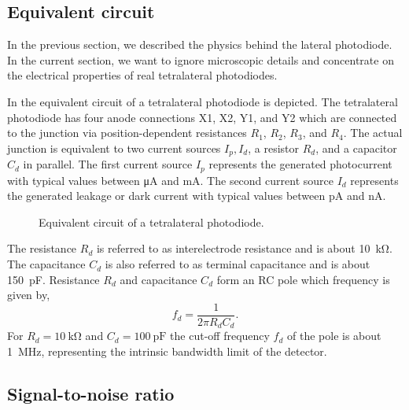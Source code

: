 \subsection{Equivalent circuit}

In the previous section, we described the physics behind the lateral photodiode.
In the current section, we want to ignore microscopic details and concentrate on the electrical properties of real tetralateral photodiodes.

In  the equivalent circuit of a tetralateral photodiode is depicted.
The tetralateral photodiode has four anode connections X1, X2, Y1, and Y2 which are connected to the junction via position-dependent resistances $R_1$, $R_2$, $R_3$, and $R_4$.
The actual junction is equivalent to two current sources $I_p,I_d$, a resistor $R_d$, and a capacitor $C_d$ in parallel.
The first current source $I_p$ represents the generated photocurrent with typical values between \si{\micro\ampere} and \si{\milli\ampere}.
The second current source $I_d$ represents the generated leakage or dark current with typical values between \si{\pico\ampere} and \si{\nano\ampere}.
\begin{figure}[H]
	\centering
	
	\caption{Equivalent circuit of a tetralateral photodiode.}\label{fig:tetralateral_photodiode_equivalent}
\end{figure}
The resistance $R_d$ is referred to as interelectrode resistance and is about \SI{10}{\kilo\ohm}.
The capacitance $C_d$ is also referred to as terminal capacitance and is about \SI{150}{\pico\farad}.
Resistance $R_d$ and capacitance $C_d$ form an RC pole which frequency is given by,
\begin{equation}
	f_d=\frac{1}{2\pi R_dC_d}.
\end{equation}
For $R_d=\SI{10}{\kilo\ohm}$ and $C_d=\SI{100}{\pico\farad}$ the cut-off frequency $f_d$ of the pole is about \SI{1}{\mega\hertz}, representing the intrinsic bandwidth limit of the detector.

\subsection{Signal-to-noise ratio}


